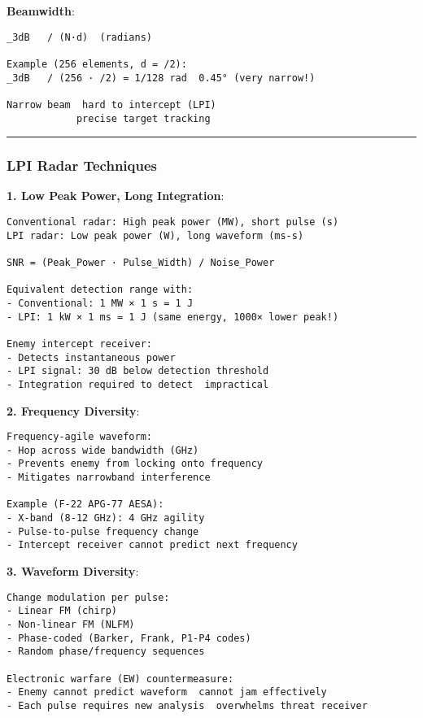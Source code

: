 \textbf{Beamwidth}:

\begin{verbatim}
_3dB   / (N·d)  (radians)

Example (256 elements, d = /2):
_3dB   / (256 · /2) = 1/128 rad  0.45° (very narrow!)

Narrow beam  hard to intercept (LPI)
            precise target tracking
\end{verbatim}

\begin{center}\rule{0.5\linewidth}{0.5pt}\end{center}

\subsubsection{LPI Radar Techniques}\label{lpi-radar-techniques}

\textbf{1. Low Peak Power, Long Integration}:

\begin{verbatim}
Conventional radar: High peak power (MW), short pulse (s)
LPI radar: Low peak power (W), long waveform (ms-s)

SNR = (Peak_Power · Pulse_Width) / Noise_Power

Equivalent detection range with:
- Conventional: 1 MW × 1 s = 1 J
- LPI: 1 kW × 1 ms = 1 J (same energy, 1000× lower peak!)

Enemy intercept receiver:
- Detects instantaneous power
- LPI signal: 30 dB below detection threshold
- Integration required to detect  impractical
\end{verbatim}

\textbf{2. Frequency Diversity}:

\begin{verbatim}
Frequency-agile waveform:
- Hop across wide bandwidth (GHz)
- Prevents enemy from locking onto frequency
- Mitigates narrowband interference

Example (F-22 APG-77 AESA):
- X-band (8-12 GHz): 4 GHz agility
- Pulse-to-pulse frequency change
- Intercept receiver cannot predict next frequency
\end{verbatim}

\textbf{3. Waveform Diversity}:

\begin{verbatim}
Change modulation per pulse:
- Linear FM (chirp)
- Non-linear FM (NLFM)
- Phase-coded (Barker, Frank, P1-P4 codes)
- Random phase/frequency sequences

Electronic warfare (EW) countermeasure:
- Enemy cannot predict waveform  cannot jam effectively
- Each pulse requires new analysis  overwhelms threat receiver
\end{verbatim}


